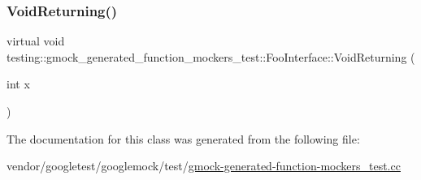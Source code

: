 \subsubsection{\texorpdfstring{Void\+Returning()}{VoidReturning()}}
{\footnotesize\ttfamily virtual void testing\+::gmock\+\_\+generated\+\_\+function\+\_\+mockers\+\_\+test\+::\+Foo\+Interface\+::\+Void\+Returning (\begin{DoxyParamCaption}\item[{int}]{x }\end{DoxyParamCaption})\hspace{0.3cm}{\ttfamily [pure virtual]}}



The documentation for this class was generated from the following file\+:\begin{DoxyCompactItemize}
\item 
vendor/googletest/googlemock/test/\hyperlink{gmock-generated-function-mockers__test_8cc}{gmock-\/generated-\/function-\/mockers\+\_\+test.\+cc}\end{DoxyCompactItemize}
